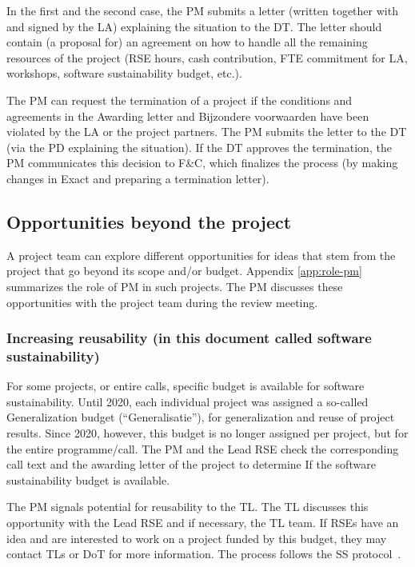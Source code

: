 \documentclass[11pt]{article}
\begin{document}
In the first and the second case, the PM submits a letter (written together with and signed by the LA) explaining the
situation to the DT. The letter should contain (a proposal for) an agreement on how to handle all the remaining
resources of the project (RSE hours, cash contribution, FTE commitment for LA, workshops, software sustainability
budget, etc.). 

The PM can request the termination of a project if the conditions and agreements in the Awarding letter and Bijzondere
voorwaarden have been violated by the LA or the project partners. The PM submits the letter to the DT (via the PD
explaining the situation). If the DT approves the termination, the PM communicates this decision to F\&C, which
finalizes the process (by making changes in Exact and preparing a termination letter).

\subsection{Opportunities beyond the project}
\label{sec:opportunities}
A project team can explore different opportunities for ideas that stem from the project that go beyond its scope and/or
budget. Appendix \ref{app:role-pm} summarizes the role of PM in such projects. The PM discusses these opportunities with the project
team during the review meeting.


\subsubsection{Increasing reusability (in this document called software sustainability)}
\label{sec:opportunities:ss}
For some projects, or entire calls, specific budget is available for software sustainability. Until 2020, each
individual project was assigned a so-called Generalization budget (“Generalisatie”), for generalization and reuse of
project results. Since 2020, however, this budget is no longer assigned per project, but for the entire programme/call.
The PM and the Lead RSE check the corresponding call text and the awarding letter of the project to determine If the
software sustainability budget is available.

The PM signals potential for reusability to the TL. The TL discusses this opportunity with the Lead RSE and if
necessary, the TL team. If RSEs have an idea and are interested to work on a project funded by this budget, they may
contact TLs or DoT for more information. The process follows the SS protocol~\cite{ss-intranet}.
\end{document}

